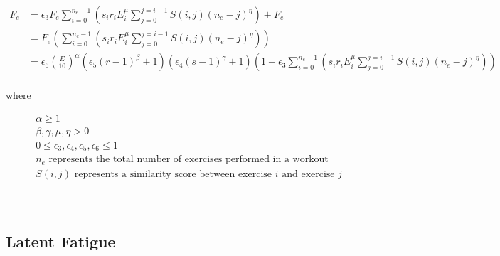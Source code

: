 \begin{minipage}{\textwidth}
	\begin{equation}
		\label{eq:P2C1_InterWorkoutFatigue}
		\begin{split}
			F_e & = 
			\epsilon_3 F_e 
			\sum_{i=0}^{n_e-1} \left( 
				s_i r_i E_i^\mu 
				\sum_{j=0}^{j=i-1} S(i,j)(n_e-j)^\eta
			\right)
			+ F_e \\
			& = F_e \left(
				\sum_{i=0}^{n_e-1} \left( 
					s_i r_i E_i^\mu 
					\sum_{j=0}^{j=i-1} S(i,j)(n_e-j)^\eta
				\right)
			\right)
			\\
			& = \epsilon_6 \left( \frac{E}{10} \right)^\alpha
				\left( \epsilon_5 (r-1)^\beta + 1 \right)
				\left(\epsilon_4 (s-1)^\gamma+1  \right)
				\left(
					1+\epsilon_3 \sum_{i=0}^{n_e-1} \left( 
						s_i r_i E_i^\mu 
						\sum_{j=0}^{j=i-1} S(i,j)(n_e-j)^\eta
					\right)
				\right)
			\\
		\end{split}
	\end{equation}
	\centerline{where}
	\begin{equation*}
		\begin{split}
		    & \alpha \ge 1 \\
		    & \beta,\gamma, \mu, \eta > 0 \\
			& 0 \le \epsilon_3, \epsilon_4, \epsilon_5, \epsilon_6 \le 1 \\
			& n_e \text{ represents the total number of exercises performed in a workout} \\
			& S(i,j) \text{ represents a similarity score between exercise }i \text{ and exercise }j \\
		\end{split}
	\end{equation*}
\end{minipage}\\

\subsection{Latent Fatigue}
\label{sec:P2C1_LatentFatigue}

